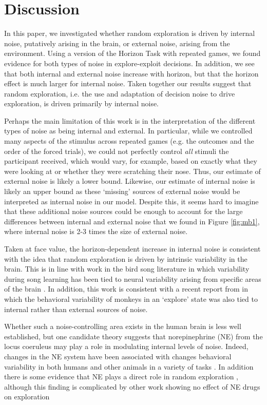\documentclass[12pt]{article}
\begin{document}
	\section*{Discussion}
	In this paper, we investigated whether random exploration is driven by internal noise, putatively arising in the brain, or external noise, arising from the environment. Using a version of the Horizon Task with repeated games, we found evidence for both types of noise in explore-exploit decisions. In addition, we see that both internal and external noise increase with horizon, but that the horizon effect is much larger for internal noise.  Taken together our results suggest that random exploration, i.e. the use and adaptation of decision noise to drive exploration, is driven primarily by internal noise.

	Perhaps the main limitation of this work is in the interpretation of the different types of noise as being internal and external. In particular, while we controlled many aspects of the stimulus across repeated games (e.g. the outcomes and the order of the forced trials), we could not perfectly control {\it all} stimuli the participant received, which would vary, for example, based on exactly what they were looking at or whether they were scratching their nose. Thus, our estimate of external noise is likely a lower bound. Likewise, our estimate of internal noise is likely an upper bound as these `missing' sources of external noise would be interpreted as internal noise in our model. Despite this, it seems hard to imagine that these additional noise sources could be enough to account for the large differences between internal and external noise that we found in Figure \ref{fig:mb1}, where internal noise is 2-3 times the size of external noise.  
	
	Taken at face value, the horizon-dependent increase in internal noise is consistent with the idea that random exploration is driven by intrinsic variability in the brain. This is in line with work in the bird song literature in which variability during song learning has been tied to neural variability arising from specific areas of the brain \citep{songbird1, songbird2}. In addition, this work is consistent with a recent report from \cite{ebitz17} in which the behavioral variability of monkeys in an `explore' state was also tied to internal rather than external sources of noise. 
	
	Whether such a noise-controlling area exists in the human brain is less well established, but one candidate theory \citep{aj2005} suggests that norepinephrine (NE) from the locus coeruleus may play a role in modulating internal levels of noise. Indeed, changes in the NE system have been associated with changes behavioral variability in both humans and other animals in a variety of tasks \citep{eeKarpova14, eeKeung18}.  In addition there is some evidence that NE plays a direct role in random exploration \citep{eeWarren17}, although this finding is complicated by other work showing no effect of NE drugs on exploration \citep{jepma2012, nieuwenhuis05}
	
\end{document}
